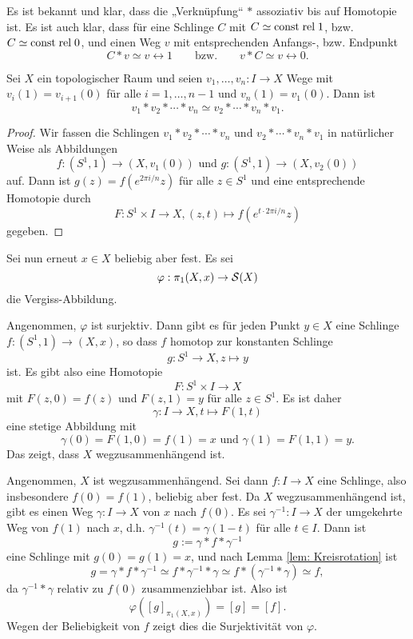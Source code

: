 \documentclass[a4paper,10pt]{article}
\begin{document}
\begin{bem}
 Es ist bekannt und klar, dass die „Verknüpfung“ $*$ assoziativ bis auf Homotopie ist. Es ist auch klar, dass für eine Schlinge $C$ mit $C \simeq \operatorname{const} \mathrel{\operatorname{rel}} 1$, bzw. $C \simeq \operatorname{const} \mathrel{\operatorname{rel}} 0$, und einen Weg $v$ mit entsprechenden Anfangs-, bzw. Endpunkt
 \[
  C * v \simeq v \rel 1 \qquad \text{bzw.} \qquad v * C \simeq v \rel 0.
 \]
\end{bem}

\begin{lem}\label{lem: Kreisrotation}
 Sei $X$ ein topologischer Raum und seien $v_1, \ldots, v_n : I \to X$ Wege mit $v_i(1) = v_{i+1}(0)$ für alle $i=1,\ldots,n-1$ und $v_n(1) = v_1(0)$. Dann ist
 \[
  v_1 * v_2 * \cdots * v_n \simeq v_2 * \cdots * v_n * v_1.
 \]
\end{lem}
\begin{proof}
 Wir fassen die Schlingen $v_1 * v_2 * \cdots * v_n$ und $v_2 * \cdots * v_n * v_1$ in natürlicher Weise als Abbildungen
 \[
  f : (S^1, 1) \to (X, v_1(0)) \text{ und } g : (S^1,1) \to (X,v_2(0))
 \]
 auf. Dann ist $g(z) = f(e^{2\pi i/n}z)$ für alle $z \in S^1$ und eine entsprechende Homotopie durch
 \[
  F : S^1 \times I \to X, (z,t) \mapsto f\left( e^{t \cdot 2\pi i/n} z \right)
 \]
 gegeben.
\end{proof}

Sei nun erneut $x \in X$ beliebig aber fest. Es sei
\[
 \varphi : \pi_1(X,x) \to \mathcal{S}(X)
\]
die Vergiss-Abbildung.

Angenommen, $\varphi$ ist surjektiv. Dann gibt es für jeden Punkt $y \in X$ eine Schlinge $f : (S^1, 1) \to (X,x)$, so dass $f$ homotop zur konstanten Schlinge
\[
 g : S^1 \to X, z \mapsto y
\]
ist. Es gibt also eine Homotopie
\[
 F : S^1 \times I \to X
\]
mit $F(z,0) = f(z)$ und $F(z,1) = y$ für alle $z \in S^1$. Es ist daher
\[
 \gamma : I \to X, t \mapsto F(1,t)
\]
eine stetige Abbildung mit
\[
 \gamma(0) = F(1,0) = f(1) = x \text{ und } \gamma(1) = F(1,1) = y.
\]
Das zeigt, dass $X$ wegzusammenhängend ist.

Angenommen, $X$ ist wegzusammenhängend. Sei dann $f : I \to X$ eine Schlinge, also insbesondere $f(0) = f(1)$, beliebig aber fest. Da $X$ wegzusammenhängend ist, gibt es einen Weg $\gamma: I \to X$ von $x$ nach $f(0)$. Es sei $\gamma^{-1} : I \to X$ der umgekehrte Weg von $f(1)$ nach $x$, d.h. $\gamma^{-1}(t) = \gamma(1-t)$ für alle $t \in I$. Dann ist
\[
 g := \gamma * f * \gamma^{-1}
\]
eine Schlinge mit $g(0) = g(1) = x$, und nach Lemma \ref{lem: Kreisrotation} ist
\[
 g = \gamma * f * \gamma^{-1} \simeq f * \gamma^{-1} * \gamma \simeq f * (\gamma^{-1} * \gamma) \simeq f,
\]
da $\gamma^{-1} * \gamma$ relativ zu $f(0)$ zusammenziehbar ist. Also ist
\[
 \varphi([g]_{\pi_1(X,x)}) = [g] = [f].
\]
Wegen der Beliebigkeit von $f$ zeigt dies die Surjektivität von $\varphi$.
\end{document}
